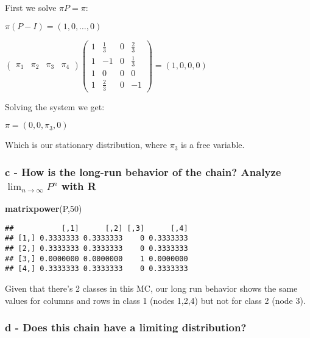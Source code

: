 \documentclass[]{article}
\newenvironment{Shaded}{\begin{snugshade}}{\end{snugshade}}
\newcommand{\DecValTok}[1]{\textcolor[rgb]{0.00,0.00,0.81}{#1}}
\newcommand{\KeywordTok}[1]{\textcolor[rgb]{0.13,0.29,0.53}{\textbf{#1}}}
\newcommand{\NormalTok}[1]{#1}
\begin{document}
First we solve \(\pi P = \pi\):

\(\pi (P-I) = (1,0, \dots, 0)\)

\(\begin{pmatrix} \pi_{1} & \pi_{2} & \pi_{3} & \pi_{4} \end{pmatrix} \begin{pmatrix} 1 & \frac{1}{3} & 0 & \frac{2}{3} \\ 1 & -1 & 0 & \frac{1}{3} \\ 1 & 0 & 0 & 0 \\ 1 & \frac{2}{3} & 0 & -1 \end{pmatrix} = (1,0,0,0)\)

Solving the system we get:

\(\pi = (0, 0, \pi_{3}, 0)\)

Which is our stationary distribution, where \(\pi_{3}\) is a free
variable.

\hypertarget{c---how-is-the-long-run-behavior-of-the-chain-analyze-lim_ntoinfty-pn-with-r}{%
\subsubsection{\texorpdfstring{c - How is the long-run behavior of the
chain? Analyze \(\lim_{n\to\infty} P^{n}\) with
R}{c - How is the long-run behavior of the chain? Analyze \textbackslash{}lim\_\{n\textbackslash{}to\textbackslash{}infty\} P\^{}\{n\} with R}}\label{c---how-is-the-long-run-behavior-of-the-chain-analyze-lim_ntoinfty-pn-with-r}}

\begin{Shaded}
\begin{Highlighting}[]
\KeywordTok{matrixpower}\NormalTok{(P,}\DecValTok{50}\NormalTok{)}
\end{Highlighting}
\end{Shaded}

\begin{verbatim}
##           [,1]      [,2] [,3]      [,4]
## [1,] 0.3333333 0.3333333    0 0.3333333
## [2,] 0.3333333 0.3333333    0 0.3333333
## [3,] 0.0000000 0.0000000    1 0.0000000
## [4,] 0.3333333 0.3333333    0 0.3333333
\end{verbatim}

Given that there's 2 classes in this MC, our long run behavior shows the
same values for columns and rows in class 1 (nodes 1,2,4) but not for
class 2 (node 3).

\hypertarget{d---does-this-chain-have-a-limiting-distribution}{%
\subsubsection{d - Does this chain have a limiting
distribution?}\label{d---does-this-chain-have-a-limiting-distribution}}
\end{document}

